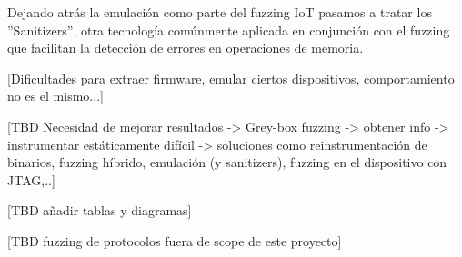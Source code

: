 Dejando atrás la emulación como parte del fuzzing IoT pasamos a tratar los ''Sanitizers'', otra tecnología comúnmente aplicada en conjunción con el 
fuzzing que facilitan la detección de errores en operaciones de memoria.

[Dificultades para extraer firmware, emular ciertos dispositivos, comportamiento no es el mismo...]

[TBD Necesidad de mejorar resultados -> Grey-box fuzzing -> obtener info -> instrumentar estáticamente difícil -> soluciones como 
reinstrumentación de binarios, fuzzing híbrido, emulación (y sanitizers), fuzzing en el dispositivo con JTAG,..]

[TBD añadir tablas y diagramas]

[TBD fuzzing de protocolos fuera de scope de este proyecto]
